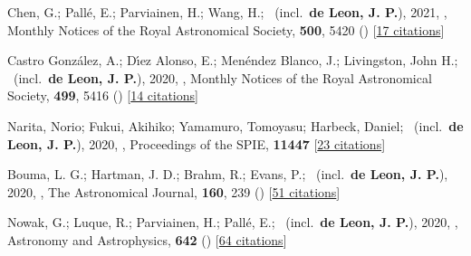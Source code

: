 \item[{\color{numcolor}\scriptsize32}] Chen, G.; Pall{\'e}, E.; Parviainen, H.; Wang, H.; \etal\ (incl.\ \textbf{de Leon, J. P.}), 2021, , Monthly Notices of the Royal Astronomical Society, \textbf{500}, 5420 () [\href{https://ui.adsabs.harvard.edu/abs/2021MNRAS.500.5420C}{17 citations}]

\item[{\color{numcolor}\scriptsize31}] Castro Gonz{\'a}lez, A.; D{\'\i}ez Alonso, E.; Men{\'e}ndez Blanco, J.; Livingston, John H.; \etal\ (incl.\ \textbf{de Leon, J. P.}), 2020, , Monthly Notices of the Royal Astronomical Society, \textbf{499}, 5416 () [\href{https://ui.adsabs.harvard.edu/abs/2020MNRAS.499.5416C}{14 citations}]

\item[{\color{numcolor}\scriptsize30}] Narita, Norio; Fukui, Akihiko; Yamamuro, Tomoyasu; Harbeck, Daniel; \etal\ (incl.\ \textbf{de Leon, J. P.}), 2020, , Proceedings of the SPIE, \textbf{11447} [\href{https://www.spiedigitallibrary.org/conference-proceedings-of-spie/10925/1092507/Focus-adjustable-motion-blur-compensation-method-using-deformable-mirror/10.1117/12.2509567.short}{23 citations}]

\item[{\color{numcolor}\scriptsize29}] Bouma, L. G.; Hartman, J. D.; Brahm, R.; Evans, P.; \etal\ (incl.\ \textbf{de Leon, J. P.}), 2020, , The Astronomical Journal, \textbf{160}, 239 () [\href{https://ui.adsabs.harvard.edu/abs/2020AJ....160..239B}{51 citations}]

\item[{\color{numcolor}\scriptsize28}] Nowak, G.; Luque, R.; Parviainen, H.; Pall{\'e}, E.; \etal\ (incl.\ \textbf{de Leon, J. P.}), 2020, , Astronomy and Astrophysics, \textbf{642} () [\href{https://ui.adsabs.harvard.edu/abs/2020A&A...642A.173N}{64 citations}]

